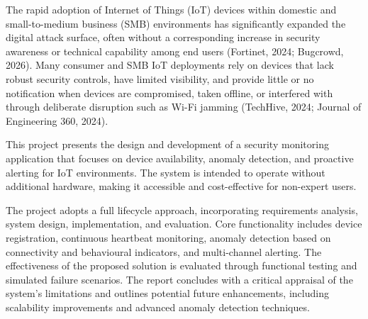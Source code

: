 The rapid adoption of Internet of Things (IoT) devices within domestic and small-to-medium business (SMB) environments has significantly expanded the digital attack surface, often without a corresponding increase in security awareness or technical capability among end users (Fortinet, 2024; Bugcrowd, 2026). Many consumer and SMB IoT deployments rely on devices that lack robust security controls, have limited visibility, and provide little or no notification when devices are compromised, taken offline, or interfered with through deliberate disruption such as Wi-Fi jamming (TechHive, 2024; Journal of Engineering 360, 2024).

This project presents the design and development of a security monitoring application that focuses on device availability, anomaly detection, and proactive alerting for IoT environments. The system is intended to operate without additional hardware, making it accessible and cost-effective for non-expert users.

The project adopts a full lifecycle approach, incorporating requirements analysis, system design, implementation, and evaluation. Core functionality includes device registration, continuous heartbeat monitoring, anomaly detection based on connectivity and behavioural indicators, and multi-channel alerting. The effectiveness of the proposed solution is evaluated through functional testing and simulated failure scenarios. The report concludes with a critical appraisal of the system's limitations and outlines potential future enhancements, including scalability improvements and advanced anomaly detection techniques.
